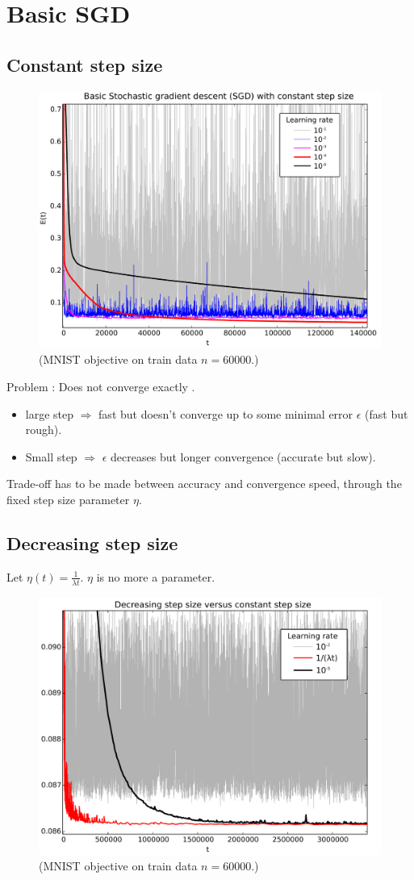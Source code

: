 \documentclass{article}
\begin{document}
\section{Basic SGD}
\subsection{Constant step size}
\begin{figure}[h!]
\includegraphics[width=\textwidth]{SG_constant_step.pdf}
\caption{(MNIST objective on train data $n=60000$.)}
\end{figure}
Problem : Does not converge exactly .
\begin{itemize}
\item large step $\Rightarrow$ fast but doesn't converge up to some minimal error $\epsilon$ (fast but rough). \item Small step $\Rightarrow$ $\epsilon$ decreases but longer convergence (accurate but slow).
\end{itemize}
Trade-off has to be made between accuracy and convergence speed, through the fixed step size parameter $\eta$.

\subsection{Decreasing step size}

Let $\eta(t) = \frac{1}{\lambda t}$. $\eta$ is no more a parameter.

\begin{figure}[h!]
\includegraphics[width=\textwidth]{SG_decreasing_step.pdf}
\caption{(MNIST objective on train data $n=60000$.)}
\end{figure}
\end{document}
